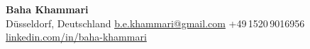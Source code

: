 \documentclass{OpenCV}
\begin{document}
\vspace*{-1.5cm}
\begin{center}
    \textbf{\Huge Baha Khammari} \\
    \vspace{5pt}
    \small
    Düsseldorf, Deutschland \quad
    \faEnvelopeO\enskip \href{mailto:b.e.khammari@gmail.com}{b.e.khammari@gmail.com} \quad
    \faMobile\enskip +49\,1520\,9016956 \quad
    \faLinkedin\enskip \href{https://www.linkedin.com/in/baha-khammari/}{linkedin.com/in/baha-khammari}
\end{center}

\vspace{-2pt}







\end{document}
